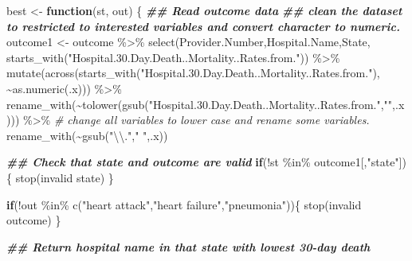 \documentclass[
]{article}
\newenvironment{Shaded}{\begin{snugshade}}{\end{snugshade}}
\newcommand{\CommentTok}[1]{\textcolor[rgb]{0.56,0.35,0.01}{\textit{#1}}}
\newcommand{\ControlFlowTok}[1]{\textcolor[rgb]{0.13,0.29,0.53}{\textbf{#1}}}
\newcommand{\DocumentationTok}[1]{\textcolor[rgb]{0.56,0.35,0.01}{\textbf{\textit{#1}}}}
\newcommand{\FunctionTok}[1]{\textcolor[rgb]{0.00,0.00,0.00}{#1}}
\newcommand{\NormalTok}[1]{#1}
\newcommand{\OtherTok}[1]{\textcolor[rgb]{0.56,0.35,0.01}{#1}}
\newcommand{\SpecialCharTok}[1]{\textcolor[rgb]{0.00,0.00,0.00}{#1}}
\newcommand{\StringTok}[1]{\textcolor[rgb]{0.31,0.60,0.02}{#1}}
\begin{document}
\begin{Shaded}
\begin{Highlighting}[]
\NormalTok{best }\OtherTok{\textless{}{-}} \ControlFlowTok{function}\NormalTok{(st, out) \{}
  \DocumentationTok{\#\# Read outcome data}
        \DocumentationTok{\#\# clean the dataset to restricted to interested variables and convert character to numeric.}
\NormalTok{          outcome1 }\OtherTok{\textless{}{-}}\NormalTok{ outcome }\SpecialCharTok{\%\textgreater{}\%}
            \FunctionTok{select}\NormalTok{(Provider.Number,Hospital.Name,State, }\FunctionTok{starts\_with}\NormalTok{(}\StringTok{"Hospital.30.Day.Death..Mortality..Rates.from."}\NormalTok{)) }\SpecialCharTok{\%\textgreater{}\%}
            \FunctionTok{mutate}\NormalTok{(}\FunctionTok{across}\NormalTok{(}\FunctionTok{starts\_with}\NormalTok{(}\StringTok{"Hospital.30.Day.Death..Mortality..Rates.from."}\NormalTok{), }\SpecialCharTok{\textasciitilde{}}\FunctionTok{as.numeric}\NormalTok{(.x))) }\SpecialCharTok{\%\textgreater{}\%}
            \FunctionTok{rename\_with}\NormalTok{(}\SpecialCharTok{\textasciitilde{}}\FunctionTok{tolower}\NormalTok{(}\FunctionTok{gsub}\NormalTok{(}\StringTok{"Hospital.30.Day.Death..Mortality..Rates.from."}\NormalTok{,}\StringTok{""}\NormalTok{,.x))) }\SpecialCharTok{\%\textgreater{}\%} \CommentTok{\# change all variables to lower case and rename some variables.}
            \FunctionTok{rename\_with}\NormalTok{(}\SpecialCharTok{\textasciitilde{}}\FunctionTok{gsub}\NormalTok{(}\StringTok{"}\SpecialCharTok{\textbackslash{}\textbackslash{}}\StringTok{."}\NormalTok{,}\StringTok{" "}\NormalTok{,.x))}

  \DocumentationTok{\#\# Check that state and outcome are valid}
            \ControlFlowTok{if}\NormalTok{(}\SpecialCharTok{!}\NormalTok{st }\SpecialCharTok{\%in\%}\NormalTok{ outcome1[,}\StringTok{"state"}\NormalTok{])\{}
              \FunctionTok{stop}\NormalTok{(}\StringTok{\textquotesingle{}invalid state\textquotesingle{}}\NormalTok{)}
\NormalTok{            \}}

            \ControlFlowTok{if}\NormalTok{(}\SpecialCharTok{!}\NormalTok{out }\SpecialCharTok{\%in\%} \FunctionTok{c}\NormalTok{(}\StringTok{"heart attack"}\NormalTok{,}\StringTok{"heart failure"}\NormalTok{,}\StringTok{"pneumonia"}\NormalTok{))\{}
              \FunctionTok{stop}\NormalTok{(}\StringTok{\textquotesingle{}invalid outcome\textquotesingle{}}\NormalTok{)}
\NormalTok{            \}}

  \DocumentationTok{\#\# Return hospital name in that state with lowest 30{-}day death}


\end{Highlighting}
\end{Shaded}
\end{document}
